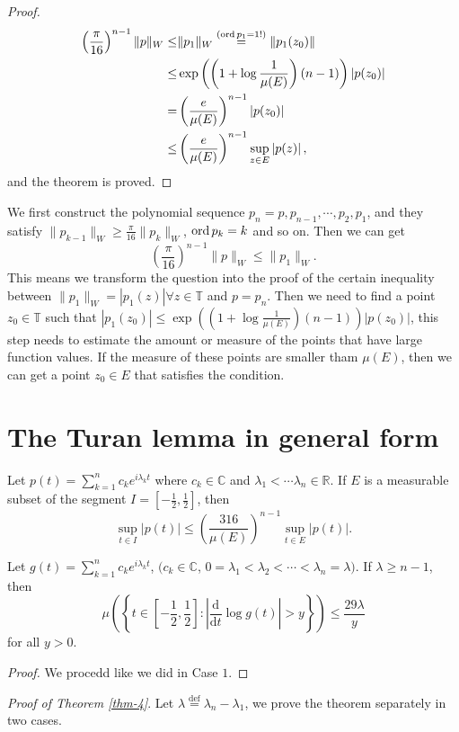 \begin{proof}
\begin{equation*}
  \begin{aligned}
    \left( \frac{\pi}{16} \right) ^{n-1}\|p\|_{W}\le & \|p_1\|_{W}\overset{(\operatorname{ord} p_1=1 !)}{=}\|p_1(z_0)\|\\
    \le & \exp\left( \left( 1+\log \frac{1}{\mu(E)} \right) (n-1) \right) \left| p(z_0) \right| \\
    = & \left( \frac{e}{\mu(E)} \right) ^{n-1}\left| p(z_0) \right| \\
    \le  & \left( \frac{e}{\mu(E)} \right) ^{n-1}\sup_{z\in E}\left| p(z) \right|,
  \end{aligned}
\end{equation*}
and the theorem is proved.
\end{proof}
\begin{remark}
  We first construct the polynomial sequence $p_n=p,p_{n-1},\cdots,p_2,p_1$, and they satisfy $\|p_{k-1}\|_{W}\ge  \frac{\pi}{16}\|p_k\|_W$, $\operatorname{ord} p_k=k$ and so on. Then we can get 
  \[
    \left( \frac{\pi}{16} \right) ^{n-1}\|p\|_{W}\le \|p_1\|_{W}.
  \] 
  This means we transform the question into the proof of the certain inequality between $\|p_1\|_W=|p_1(z)| \forall z\in \mathbb{T}$ and $p=p_n$. Then we need to find a point  $z_0 \in \mathbb{T}$ such that $\left| p_1(z_0) \right|\le \exp\left( \left(1+\log \frac{1}{\mu(E)}\right)(n-1) \right) \left| p(z_0) \right|  $, this step needs to estimate the amount or measure of the points that have large function values. If the measure of these points are smaller tham $\mu(E)$, then we can get a point  $z_0 \in E$ that satisfies the condition.
\end{remark}
\section{The Turan lemma in general form}
\begin{theorem}\label{thm-4}
   Let $p(t)=\sum_{k=1}^{n} c_k e^{i\lambda_kt}$ where $c_k\in \mathbb{C}$ and $\lambda_1<\cdots\lambda_n \in \mathbb{R}$. If $E $ is a measurable subset of the segment $I=\left[ -\frac{1}{2},\frac{1}{2} \right] $, then
   \[
     \sup_{t\in I}\left| p(t) \right| \le \left( \frac{316}{\mu(E)} \right) ^{n-1}\sup_{t\in E}\left| p(t) \right| .
   \] 
 \end{theorem} 

 \begin{lemma}\label{lemma-3}
   Let $g(t)=\sum_{k=1}^{n} c_k e^{i\lambda_kt}$, $(c_k\in \mathbb{C}$, $0=\lambda_1<\lambda_2<\cdots<\lambda_n=\lambda)$. If $\lambda \ge n-1$, then 
   \[
     \mu\left( \left\{ t\in \left[ -\frac{1}{2},\frac{1}{2} \right] :\left|  \frac{\mathrm{d}}{\mathrm{d}t}\log g(t) \right| >y \right\}  \right) \le \frac{29\lambda}{y}
   \] 
   for all $y>0$.
\end{lemma}
\begin{proof}
  We procedd like we did in Case $1$.
\end{proof}
{\itshape Proof of Theorem \ref{thm-4}}. Let $\lambda  \overset{\mathrm{def}}{=}\lambda_n-\lambda_1$, we prove the theorem separately in two cases.

